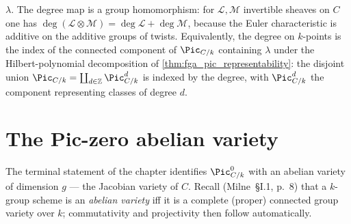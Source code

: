 \begin{definition}
  \(\lambda\). The degree map is a group homomorphism: for
  \(\mathcal{L}, \mathcal{M}\) invertible sheaves on \(C\) one has
  \(\deg(\mathcal{L} \otimes \mathcal{M}) = \deg \mathcal{L} + \deg \mathcal{M}\),
  because the Euler characteristic is additive on the additive groups of
  twists. Equivalently, the degree on \(k\)-points is the index of the
  connected component of \(\Pic_{C/k}\) containing \(\lambda\) under the
  Hilbert-polynomial decomposition of
  \cref{thm:fga_pic_representability}: the disjoint union
  \(\Pic_{C/k} = \coprod_{d \in \mathbb{Z}} \Pic^d_{C/k}\) is indexed by
  the degree, with \(\Pic^d_{C/k}\) the component representing classes
  of degree \(d\).
\end{definition}

\section{The Pic-zero abelian variety}
\label{sec:pic0_abelian_variety}

The terminal statement of the chapter identifies \(\Pic^0_{C/k}\) with
an abelian variety of dimension \(g\) --- the Jacobian variety of \(C\).
Recall (Milne~\S I.1, p.~8) that a \(k\)-group scheme is an
\emph{abelian variety} iff it is a complete (proper) connected group
variety over \(k\); commutativity and projectivity then follow
automatically.


